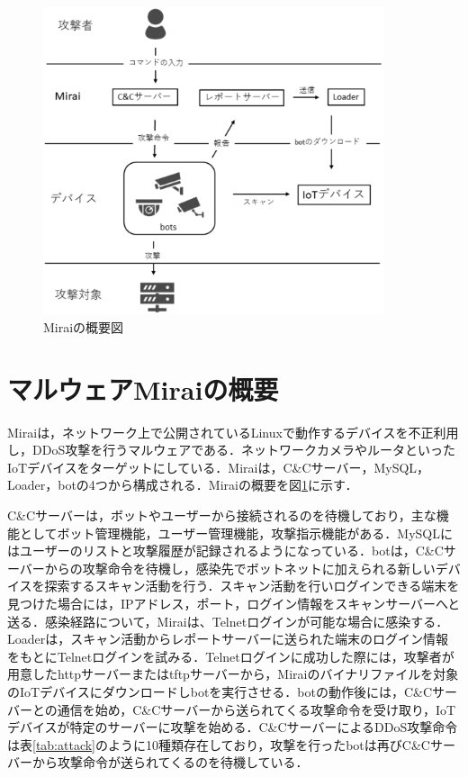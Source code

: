\begin{figure}[h]
   \centering
      \includegraphics[width=100mm]{figures/s.eps}
      \caption{Miraiの概要図}
   \label{fig:Mirai_system}   
\end{figure}

 

\section{マルウェアMiraiの概要}

Mirai\cite{Mirai}は，ネットワーク上で公開されているLinuxで動作するデバイスを不正利用し，DDoS攻撃を行うマルウェアである．ネットワークカメラやルータといったIoTデバイスをターゲットにしている．Miraiは，C\&Cサーバー，MySQL，Loader，botの4つから構成される．Miraiの概要を図\ref{fig:Mirai_system}に示す．


C\&Cサーバーは，ボットやユーザーから接続されるのを待機しており，主な機能としてボット管理機能，ユーザー管理機能，攻撃指示機能がある．MySQLにはユーザーのリストと攻撃履歴が記録されるようになっている．botは，C\&Cサーバーからの攻撃命令を待機し，感染先でボットネットに加えられる新しいデバイスを探索するスキャン活動を行う．スキャン活動を行いログインできる端末を見つけた場合には，IPアドレス，ポート，ログイン情報をスキャンサーバーへと送る．感染経路について，Miraiは、Telnetログインが可能な場合に感染する．Loaderは，スキャン活動からレポートサーバーに送られた端末のログイン情報をもとにTelnetログインを試みる．Telnetログインに成功した際には，攻撃者が用意したhttpサーバーまたはtftpサーバーから，Miraiのバイナリファイルを対象のIoTデバイスにダウンロードしbotを実行させる．botの動作後には，C\&Cサーバーとの通信を始め，C\&Cサーバーから送られてくる攻撃命令を受け取り，IoTデバイスが特定のサーバーに攻撃を始める．C\&CサーバーによるDDoS攻撃命令は表\ref{tab:attack}のように10種類存在しており，攻撃を行ったbotは再びC\&Cサーバーから攻撃命令が送られてくるのを待機している．

